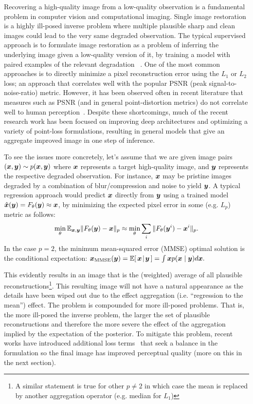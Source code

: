 \documentclass[10pt]{article} %
\begin{document}
Recovering a high-quality image from a low-quality observation is a fundamental problem in computer vision and computational imaging. Single image restoration is a highly ill-posed inverse problem where multiple plausible sharp and clean images could lead to the very same degraded observation. The typical supervised approach is to formulate image restoration as a problem of inferring the underlying image given a low-quality version of it, by training a model with paired examples of the relevant degradation ~\citep{ongie2020deep}. One of the most common approaches is to directly minimize a pixel reconstruction error using the $L_1$ or $L_2$ loss; an approach that correlates well with the popular PSNR (peak signal-to-noise-ratio) metric. However, it has been observed often in recent literature that measures such as PSNR (and in general point-distortion metrics) do not correlate well to human perception~\citep{blau2018perception,delbracio2021projected,freirich2021theory}. Despite these shortcomings, much of the recent research work has been focused on improving deep architectures and optimizing a variety of point-loss formulations, resulting in general models that give an aggregate improved image in one step of inference. 

To see the issues more concretely, let's assume that we are given image pairs $({\bm{x}},{\bm{y}}) \sim p({\bm{x}}, {\bm{y}})$ where ${\bm{x}}$ represents a target high-quality image, and ${\bm{y}}$ represents the respective degraded observation. For instance, ${\bm{x}}$ may be pristine images degraded by a combination of blur/compression and noise to yield ${\bm{y}}$. A typical regression approach would predict ${\bm{x}}$ directly from ${\bm{y}}$ using a trained model $\hat{{\bm{x}}}({\bm{y}}) = F_\theta({\bm{y}}) \approx {\bm{x}}$, by minimizing the expected pixel error in some (e.g. $L_p$) metric as follows:
$$
\min_\theta \mathbb{E}_{{\bm{x}},{\bm{y}}} \| F_\theta({\bm{y}}) - {\bm{x}} \|_p  \approx \min_\theta \sum_i \| F_\theta({\bm{y}}^i) - {\bm{x}}^i \|_p.
$$
In the case $p=2$, the minimum mean-squared error (MMSE) optimal solution is the conditional expectation:
$
{\bm{x}}_{\text{MMSE}} ({\bm{y}}) = \mathbb{E}[\,{\bm{x}}\!\mid\!{\bm{y}}\,] = \int {\bm{x}} p({\bm{x}} \mid {\bm{y}}) d{\bm{x}}. 
$

This evidently results in an image that is the (weighted) average of all plausible reconstructions\footnote{A similar statement is true for other $p\neq 2$ in which case the mean is replaced by another aggregation operator (e.g. median for $L_1$)}. This resulting image will not have a natural appearance as the details have been wiped out due to the effect aggregation (i.e. ``regression to the mean'') effect. The problem is compounded for more ill-posed problems. That is, the more ill-posed the inverse problem, the larger the set of plausible reconstructions and therefore the more severe the effect of the aggregation implied by the expectation of the posterior. To mitigate this problem, recent works have  introduced additional loss terms~ \citep{gatys2016image,mechrez2018contextual,mechrez2018maintaining,delbracio2021projected,kupyn2018deblurgan} that seek a balance in the formulation so the final image has improved perceptual quality (more on this in the next section). 
\end{document}
